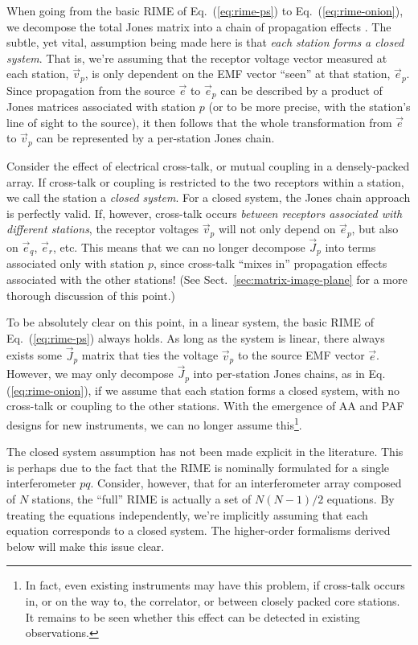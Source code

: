\documentclass[]{aa}
\newcommand{\jones}[2]{\vec {#1}_{#2}}
\begin{document}
When going from the basic RIME of Eq.~(\ref{eq:rime-ps}) to Eq.~(\ref{eq:rime-onion}), we decompose the total Jones matrix into a chain of propagation effects \citep[see Paper I,][]{RRIME1}. The subtle, yet vital, assumption being made here is that  \emph{each station forms a closed system}. That is, we're assuming that the receptor voltage vector measured at each station, $\vec{v}_{p}$, is only dependent on the EMF vector ``seen'' at that station, $\vec e_{p}$. Since propagation from the source $\vec e$ to $\vec e_{p}$ can be described by a product of Jones matrices associated with station $p$ (or to be more precise, with the station's line of sight to the source), it then follows that the whole transformation from $\vec e$ to $\vec v_p$ can be represented by a per-station Jones chain.

Consider the effect of electrical cross-talk, or mutual coupling in a densely-packed array. If cross-talk or coupling is restricted to
the two receptors within a station, we call the station a \emph{closed system}. For a closed system, the Jones chain approach is perfectly valid. If, however, cross-talk occurs \emph{between receptors associated with different stations}, the receptor voltages $\vec{v}_{p}$ will
not only depend on $\vec e_{p}$, but also on $\vec e_{q}$, $\vec e_{r}$, etc. This means that we can no longer decompose
$\jones{J}{p}$ into terms associated only with station $p$, since cross-talk ``mixes in'' propagation effects
associated with the other stations! (See Sect.~\ref{sec:matrix-image-plane} for a more thorough discussion of this point.)

To be absolutely clear on this point, in a linear system, the basic RIME of Eq.~(\ref{eq:rime-ps}) always holds. As long as the system is
linear, there always exists some $\jones{J}{p}$ matrix that ties the voltage $\vec v_p$ to the source EMF vector $\vec e$. However, we may only decompose $\jones{J}{p}$ into per-station Jones chains, as in Eq. (\ref{eq:rime-onion}), if we assume that each station forms a closed system, with no cross-talk or coupling to the other stations. With the emergence of AA and PAF designs for new instruments, we can no longer assume this\footnote{In fact, even existing instruments may have this problem, if cross-talk occurs in, or on the way to, the correlator, or between closely packed core stations. It remains to be seen
whether this effect can be detected in existing observations.}.%

The closed system assumption has not been made explicit in the literature. This is perhaps due to the fact that the RIME is nominally formulated for a single interferometer $pq$. Consider, however, that for an interferometer array composed of $N$ stations, the ``full'' RIME is actually a set of $N(N-1)/2$ equations. By treating the equations independently, we're implicitly assuming that each equation corresponds to a closed system. The higher-order 
formalisms derived below will make this issue clear.
\end{document}
